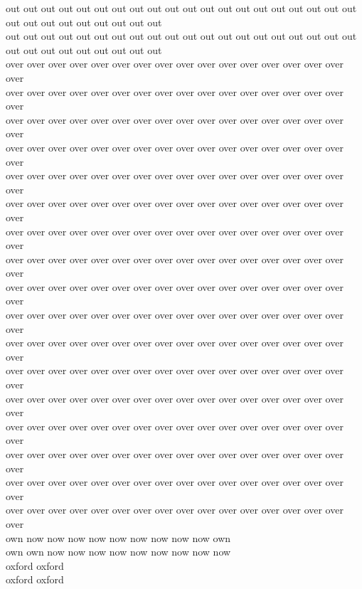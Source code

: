 out out out out out out out out out out out out out out out out out out out out out out out out out out out out out\\
out out out out out out out out out out out out out out out out out out out out out out out out out out out out out\\
over over over over over over over over over over over over over over over over over\\
over over over over over over over over over over over over over over over over over\\
over over over over over over over over over over over over over over over over over\\
over over over over over over over over over over over over over over over over over\\
over over over over over over over over over over over over over over over over over\\
over over over over over over over over over over over over over over over over over\\
over over over over over over over over over over over over over over over over over\\
over over over over over over over over over over over over over over over over over\\
over over over over over over over over over over over over over over over over over\\
over over over over over over over over over over over over over over over over over\\
over over over over over over over over over over over over over over over over over\\
over over over over over over over over over over over over over over over over over\\
over over over over over over over over over over over over over over over over over\\
over over over over over over over over over over over over over over over over over\\
over over over over over over over over over over over over over over over over over\\
over over over over over over over over over over over over over over over over over\\
over over over over over over over over over over over over over over over over over\\
own now now now now now now now now now own\\
own own now now now now now now now now now\\
oxford oxford\\
oxford oxford\\


